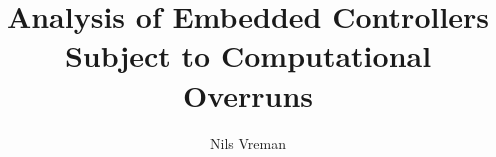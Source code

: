 \begin{titlepages}
    \author{Nils Vreman}
    \title{Analysis of Embedded Controllers \\Subject to Computational Overruns}
\end{titlepages}
